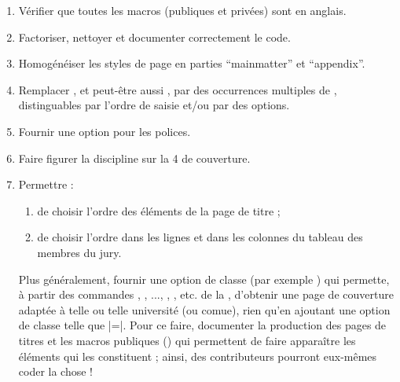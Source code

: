 \begin{enumerate}
\item Vérifier que toutes les macros (publiques et privées) sont en anglais.
\item Factoriser, nettoyer et documenter correctement le code.
\item Homogénéiser les styles de page en parties \enquote{mainmatter} et
  \enquote{appendix}.
\item Remplacer , et peut-être aussi , par des
  occurrences multiples de , distinguables par l'ordre de saisie
  et/ou par des  options.
\item Fournir une option pour les polices.
\item Faire figurer la discipline sur la 4\ieme{} de couverture.
\item Permettre :
  \begin{enumerate}
  \item de choisir l'ordre des éléments de la page de titre ;
  \item de choisir l'ordre dans les lignes et dans les colonnes du
    tableau des membres du jury.
  \end{enumerate}
  Plus généralement, fournir une option de classe (par exemple
  ) qui permette, à partir des commandes
  , , ...,
  , , etc. de la \yatCl{},
  d'obtenir une page de couverture adaptée à telle ou telle université (ou
  \gls{comue}), rien qu'en ajoutant une option de classe telle que
  |=|. Pour ce faire, documenter la
  production des pages de titres et les macros publiques
  () qui permettent de faire apparaître les éléments
  qui les constituent ; ainsi, des contributeurs pourront eux-mêmes coder la
  chose !

\end{enumerate}
